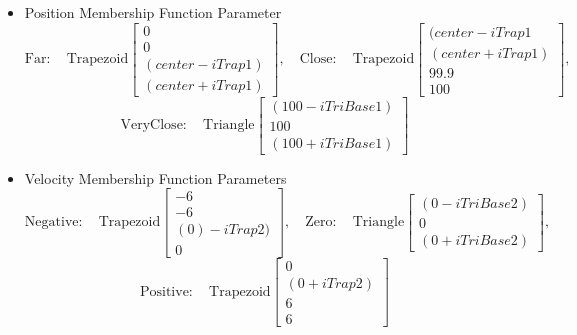 \begin{itemize} \item Position Membership Function Parameter \begin{displaymath} \mathrm{Far:}\quad
\mathrm{Trapezoid}\begin{bmatrix} 0\\0\\(center-iTrap1)\\(center+iTrap1) \end{bmatrix}, \quad
\mathrm{Close:}\quad \mathrm{Trapezoid}\begin{bmatrix} (center-iTrap1\\(center+iTrap1)\\99.9\\100
\end{bmatrix}, \end{displaymath} \begin{displaymath} \mathrm{VeryClose:}\quad \mathrm{Triangle}\begin{bmatrix}
(100-iTriBase1)\\100\\ (100+iTriBase1) \end{bmatrix} \end{displaymath}
 
 \item Velocity Membership Function Parameters \begin{displaymath} \mathrm{Negative:}\quad
     \mathrm{Trapezoid}\begin{bmatrix} -6\\-6\\(0)-iTrap2)\\0 \end{bmatrix}, \quad \mathrm{Zero:}\quad
     \mathrm{Triangle}\begin{bmatrix} (0-iTriBase2)\\0\\ (0+iTriBase2) \end{bmatrix}, \end{displaymath}
         \begin{displaymath} \mathrm{Positive:}\quad \mathrm{Trapezoid}\begin{bmatrix} 0\\ (0+iTrap2)\\6\\6
         \end{bmatrix} \end{displaymath}
 

\end{itemize}
